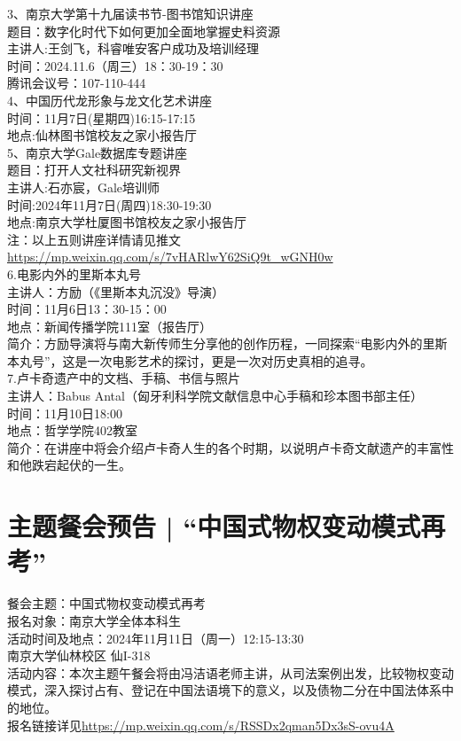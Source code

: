 \documentclass[letterpaper, 12pt]{article}
\begin{document}
\begin{multicols}{2}
3、南京大学第十九届读书节-图书馆知识讲座\\
题目：数字化时代下如何更加全面地掌握史料资源\\
主讲人:王剑飞，科睿唯安客户成功及培训经理\\
时间：2024.11.6（周三）18：30-19：30\\
腾讯会议号：107-110-444\\

4、中国历代龙形象与龙文化艺术讲座\\
时间：11月7日(星期四)16:15-17:15\\
地点:仙林图书馆校友之家小报告厅\\

5、南京大学Gale数据库专题讲座\\
题目：打开人文社科研究新视界\\
主讲人:石亦宸，Gale培训师\\
时间:2024年11月7日(周四)18:30-19:30\\
地点:南京大学杜厦图书馆校友之家小报告厅\\

注：以上五则讲座详情请见推文\url{https://mp.weixin.qq.com/s/7vHARlwY62SiQ9t_wGNH0w}\\

6.电影内外的里斯本丸号\\
主讲人：方励（《里斯本丸沉没》导演）\\
时间：11月6日13：30-15：00\\
地点：新闻传播学院111室（报告厅）\\
简介：方励导演将与南大新传师生分享他的创作历程，一同探索“电影内外的里斯本丸号”，这是一次电影艺术的探讨，更是一次对历史真相的追寻。\\

7.卢卡奇遗产中的文档、手稿、书信与照片\\
主讲人：Babus Antal（匈牙利科学院文献信息中心手稿和珍本图书部主任）\\
时间：11月10日18:00\\
地点：哲学学院402教室\\
简介：在讲座中将会介绍卢卡奇人生的各个时期，以说明卢卡奇文献遗产的丰富性和他跌宕起伏的一生。\\

\section{主题餐会预告 | “中国式物权变动模式再考”}
餐会主题：中国式物权变动模式再考\\报名对象：南京大学全体本科生\\活动时间及地点：2024年11月11日（周一）12:15-13:30\\南京大学仙林校区 仙I-318\\活动内容：本次主题午餐会将由冯洁语老师主讲，从司法案例出发，比较物权变动模式，深入探讨占有、登记在中国法语境下的意义，以及债物二分在中国法体系中的地位。\\
报名链接详见\url{https://mp.weixin.qq.com/s/RSSDx2qman5Dx3sS-ovu4A}

\end{multicols}
\end{document}
